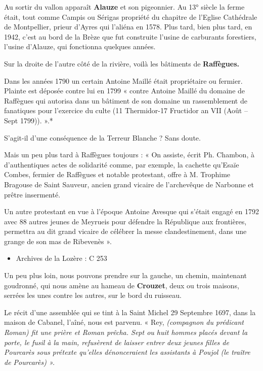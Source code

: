 Au sortir du vallon apparaît \textbf{Alauze} et son pigeonnier. Au 13° siècle la ferme était, tout
comme Campis ou Sérigas propriété du chapitre de l’Eglise Cathédrale de Montpellier, prieur
d’Ayres qui l’aliéna en 1578. Plus tard, bien plus tard, en 1942, c’est au bord de la Brèze que
fut construite l’usine de carburants forestiers, l’usine d’Alauze, qui fonctionna quelques
années.

\vspace{0.2cm}

Sur la droite de l’autre côté de la rivière, voilà les bâtiments de \textbf{Raffègues.}

Dans les années 1790 un certain Antoine Maillé était propriétaire ou fermier. Plainte est
déposée contre lui en 1799 « contre Antoine Maillé du domaine de Raffègues qui autorisa
dans un bâtiment de son domaine un rassemblement de fanatiques pour l’exercice du culte
(11 Thermidor-17 Fructidor an VII (Août --Sept 1799)). ».*

S’agit-il d’une conséquence de la Terreur Blanche ? Sans doute.

\vspace{0.2cm}

Mais un peu plus tard à Raffègues toujours : « On assiste, écrit Ph. Chambon, à d’authentiques
actes de solidarité comme, par exemple, la cachette qu’Esaïe Combes, fermier de Raffègues et
notable protestant, offre à M. Trophime Bragouse de Saint Sauveur, ancien grand vicaire de
l’archevêque de Narbonne et prêtre insermenté.

Un autre protestant en vue à l’époque Antoine Avesque qui s’était engagé en 1792 avec 88
autres jeunes de Meyrueis pour défendre la République aux frontières, permettra au dit grand
vicaire de célébrer la messe clandestinement, dans une grange de son mas de Ribevenès ».

\vspace{0.3cm}

\begin{itemize}
    \item Archives de la Lozère : C 253
\end{itemize}


Un peu plus loin, nous pouvons prendre sur la gauche, un chemin, maintenant goudronné, qui
nous amène au hameau de \textbf{Crouzet}, deux ou trois maisons, serrées les unes contre les autres,
sur le bord du ruisseau.

Le récit d’une assemblée qui se tint à la Saint Michel 29 Septembre 1697, dans la maison de
Cabanel, l’aîné, nous est parvenu. « Rey, \textit{(compagnon du prédicant Roman) fit une prière et
Roman prêcha. Sept ou huit hommes placés devant la porte, le fusil à la main, refusèrent de
laisser entrer deux jeunes filles de Pourcarès sous prétexte qu’elles dénonceraient les
assistants à Poujol (le traître de Pourcarès) ».}

